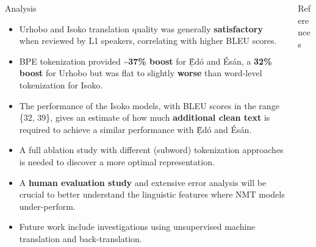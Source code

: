\documentclass[final]{beamer}
\newlength{\onecolwid}
\newlength{\twocolwid}
\begin{document}
\begin{frame}[t]
\begin{columns}[t]
\begin{column}{\twocolwid}
\begin{columns}[t,totalwidth=\twocolwid]
\begin{column}{\onecolwid}
\begin{block}{Analysis}
\begin{itemize}
\item Urhobo and Isoko translation quality was generally \textbf{satisfactory} when reviewed by L1 speakers, correlating with higher BLEU scores.
\item BPE tokenization provided \textbf{\textasciitilde{37\%} boost} for \d{\`E}d{\'o} and {\'E}s{\'a}n, a \textbf{32\% boost} for Urhobo but was flat to slightly \textbf{worse} than word-level tokenization for Isoko.
\item The performance of the Isoko models, with BLEU scores in the range \{32, 39\}, gives an estimate of how much \textbf{additional clean text} is required to achieve a similar performance with \d{\`E}d{\'o} and {\'E}s{\'a}n.
\item A full ablation study with different (subword) tokenization approaches is needed to discover a more optimal representation.
\item A \textbf{human evaluation study} and extensive error analysis will be crucial to better understand the linguistic features where NMT models under-perform.
\item Future work include investigations using unsupervised machine translation and back-translation.
\end{itemize}

\end{block}


\end{column} %

\begin{column}{\onecolwid} %

\begin{block}{References}





\end{block}
\end{column}
\end{columns}
\end{column}
\end{columns}
\end{frame}
\end{document}
